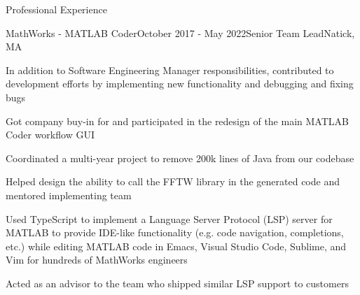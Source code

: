 \documentclass[
	usletter %
	10pt, %
]{resume} %
\begin{document}
\begin{rSection}{Professional Experience}
	\begin{rSubsection}{MathWorks - MATLAB Coder}{October 2017 - May 2022}{Senior Team Lead}{Natick, MA}
		\item In addition to Software Engineering Manager responsibilities, contributed to development efforts by implementing new functionality and debugging and fixing bugs
		\item Got company buy-in for and participated in the redesign of the main MATLAB Coder workflow GUI
		\item Coordinated a multi-year project to remove 200k lines of Java from our codebase
		\item Helped design the ability to call the FFTW library in the generated code and mentored implementing team
		\item Used TypeScript to implement a Language Server Protocol (LSP) server for MATLAB to provide IDE-like functionality (e.g. code navigation, completions, etc.) while editing MATLAB code in Emacs, Visual Studio Code, Sublime, and Vim for hundreds of MathWorks engineers
		\item Acted as an advisor to the team who shipped similar LSP support to customers
	\end{rSubsection}



\end{rSection}
\end{document}
